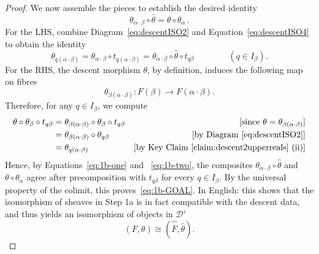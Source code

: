 \documentclass[a4paper, 11pt,reqno]{amsart}
\newcommand{\D}{\mathcal{D}}
\begin{document}
\begin{proof}
We now assemble the pieces to establish the desired identity 
\begin{equation}\label{eq:1b-GOAL}
\theta_{\alpha\cdot\beta}\circ\widehat\theta=\theta\circ\theta_\alpha\,.
\end{equation}
For the LHS, combine Diagram~\eqref{eq:descentISO2} and Equation~\eqref{eq:descentISO4} to obtain the identity 
\begin{equation}\label{eq:1b-one}
\theta_{q(\alpha\cdot\beta)}=\theta_{\alpha\cdot\beta} \circ t_{q(\alpha\cdot\beta)} =\theta_{\alpha\cdot\beta}\circ  \widehat{\theta}\circ t_{q\beta} \qquad \qquad(q\in I_\beta).
\end{equation}
For the RHS, the descent morphism $\theta$, by definition, induces the following map on fibres 
\[
\theta_{\beta(\alpha\cdot\beta)}\colon
F(\beta)\longrightarrow F(\alpha\cdot\beta).
\]
Therefore, for any $q\in I_\beta$, we compute
\begin{align}\label{eq:1b-two}
\theta\circ\theta_\beta\circ t_{q\beta} &= \theta_{\beta(\alpha\cdot\beta)}\circ\theta_\beta\circ t_{q\beta} & \text{[since $\theta=\theta_{\beta(\alpha\cdot\beta)}$]}\nonumber\\
&= \theta_{\beta(\alpha\cdot\beta)} \circ \theta_{q\beta} & \text{[by Diagram~\eqref{eq:descentISO2}]}\nonumber \\
&= \theta_{q(\alpha\cdot\beta)} & \text{[by Key Claim~\ref{claim:descent2upperreals} (ii)]}
\end{align}
Hence, by Equations~\eqref{eq:1b-one} and ~\eqref{eq:1b-two}, the composites $\theta_{\alpha\cdot\beta}\circ\widehat\theta$ and $\theta\circ\theta_\alpha$ agree after precomposition with $t_{q\beta}$ for every $q\in I_\beta$. By the universal property of the
colimit, this proves~\eqref{eq:1b-GOAL}. In English: this shows that the isomorphism of sheaves in Step 1a is in fact compatible with the descent data, and thus yields an isomorphism of objects in $\D'$
\[
(F,\theta)\cong
(\widehat{\overline F},\widehat\theta).
\]

\end{proof}
\end{document}
